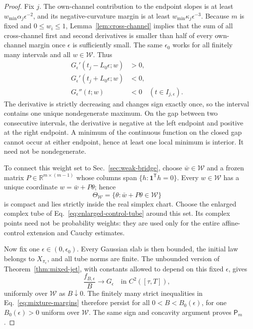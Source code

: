 \documentclass[aps,physrev,onecolumn,amsmath,amssymb,longbibliography]{revtex4-2}
\newcommand{\Wset}{\mathcal W}
\begin{document}
\begin{proof}
Fix \(j\).  The own-channel contribution to the endpoint slopes is at least
\(w_{\min}\alpha_j\epsilon^{-2}\), and its negative-curvature margin is at
least \(w_{\min}\kappa_j\epsilon^{-3}\).  Because \(m\) is fixed and
\(0\le w_i\le1\), Lemma~\ref{lem:cross-channel} implies that the sum of all
cross-channel first and second derivatives is smaller than half of every
own-channel margin once \(\epsilon\) is sufficiently small.  The same
\(\epsilon_0\) works for all finitely many intervals and all \(w\in\Wset\).
Thus
\begin{align}
 G_\epsilon'(t_j-L_0\epsilon;w)&>0,\nonumber\\
 G_\epsilon'(t_j+L_0\epsilon;w)&<0,\nonumber\\
 G_\epsilon''(t;w)&<0\quad(t\in I_{j,\epsilon}).
 \label{eq:mixture-margins}
\end{align}
The derivative is strictly decreasing and changes sign exactly once, so the
interval contains one unique nondegenerate maximum.  On the gap between two
consecutive intervals, the derivative is negative at the left endpoint and
positive at the right endpoint.  A minimum of the continuous function on the
closed gap cannot occur at either endpoint, hence at least one local minimum
is interior.  It need not be nondegenerate.

To connect this weight set to Sec.~\ref{sec:weak-bridge}, choose
\(\bar w\in\Wset\) and a frozen matrix
\(P\in\mathbb R^{m\times(m-1)}\) whose columns span
\(\{h:\bm1^{\mathsf T}h=0\}\).  Every \(w\in\Wset\) has a unique coordinate
\(w=\bar w+P\theta\); hence
\begin{equation}
 \Theta_{\Wset}=\{\theta:\bar w+P\theta\in\Wset\}
 \label{eq:weight-to-control-set}
\end{equation}
is compact and lies strictly inside the real simplex chart.  Choose the
enlarged complex tube of Eq.~\eqref{eq:enlarged-control-tube} around this set.
Its complex points need not be probability weights: they are used only for the
entire affine-control extension and Cauchy estimates.

Now fix one \(\epsilon\in(0,\epsilon_0)\).  Every Gaussian slab is then
bounded, the initial law belongs to \(X_{\pi_\epsilon}\), and all tube norms
are finite.  The unbounded version of Theorem~\ref{thm:mixed-jet}, with
constants allowed to depend on this fixed \(\epsilon\), gives
\begin{equation}
 \frac{f_{B,\epsilon}}{B}\longrightarrow G_\epsilon
 \quad\text{in }C^2([\tau,T]),
 \label{eq:positive-B-transfer}
\end{equation}
uniformly over \(\Wset\) as \(B\downarrow0\).  The finitely many strict
inequalities in Eq.~\eqref{eq:mixture-margins} therefore persist for all
\(0<B<B_0(\epsilon)\), for one \(B_0(\epsilon)>0\) uniform over \(\Wset\).
The same sign and concavity argument proves \(\mathsf P_m\).
\end{proof}
\end{document}
